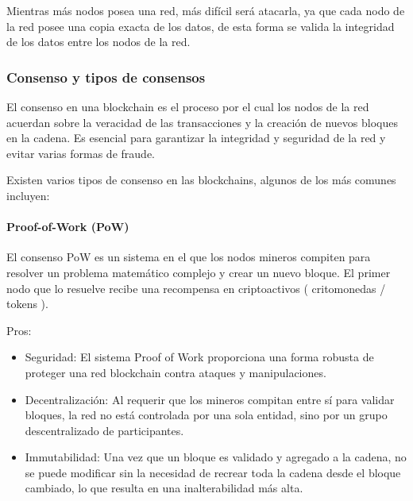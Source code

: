 Mientras más nodos posea una red, más difícil será atacarla, ya que cada nodo de la red posee una copia exacta de los datos, de esta forma se valida la integridad de los datos entre los nodos de la red.

\subsubsection{Consenso y tipos de consensos}

El consenso\cite{consensus} en una blockchain es el proceso por el cual los nodos de la red acuerdan sobre la veracidad de las transacciones y la creación de nuevos bloques en la cadena. Es esencial para garantizar la integridad y seguridad de la red y evitar varias formas de fraude.

\bigskip

Existen varios tipos de consenso en las blockchains, algunos de los más comunes incluyen:

\paragraph{Proof-of-Work (PoW)} El consenso PoW es un sistema en el que los nodos mineros compiten para resolver un problema matemático complejo y crear un nuevo bloque. El primer nodo que lo resuelve recibe una recompensa en criptoactivos ( critomonedas / tokens ).

\bigskip

Pros:
\begin{itemize}

    \item Seguridad: El sistema Proof of Work proporciona una forma robusta de proteger una red blockchain contra ataques y manipulaciones.

    \item Decentralización: Al requerir que los mineros compitan entre sí para validar bloques, la red no está controlada por una sola entidad, sino por un grupo descentralizado de participantes.

    \item Immutabilidad: Una vez que un bloque es validado y agregado a la cadena, no se puede modificar sin la necesidad de recrear toda la cadena desde el bloque cambiado, lo que resulta en una inalterabilidad más alta.
    
\end{itemize}

